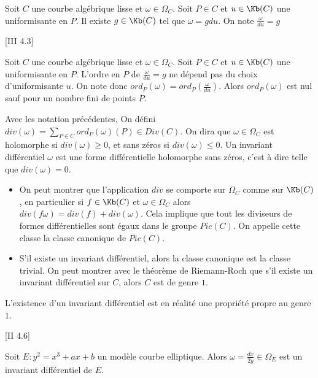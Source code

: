 \begin{Def}
	Soit $C$ une courbe algébrique lisse et $\omega\in\Omega_{C}$. Soit $P\in C$ et $u\in \Kb(C)$ une uniformisante en $P$. Il existe $g\in\Kb(C)$ tel que $\omega = gdu$. On note $\frac{\omega}{du} = g$
\end{Def}

\begin{Prop}\cite{Sil09}[III 4.3]
	
	Soit $C$ une courbe algébrique lisse et $\omega\in\Omega_{C}$. Soit $P\in C$ et $u\in \Kb(C)$ une uniformisante en $P$. L'ordre en $P$ de $\frac{\omega}{du} = g$ ne dépend pas du choix d'uniformisante $u$. On note donc $ord_{P}(\omega) = ord_{P}(\frac{\omega}{du})$. Alors $ord_{P}(\omega)$ est nul sauf pour un nombre fini de points $P$.
\end{Prop}



\begin{Def}
	Avec les notation précédentes, On défini $div(\omega) = \sum_{P\in C} ord_{P}(\omega)(P) \in Div(C)$. On dira que $\omega\in\Omega_{C}$ est holomorphe si $div(\omega)\geq 0$, et sans zéros si $div(\omega)\leq 0$. Un invariant différentiel $\omega$ est une forme différentielle holomorphe sans zéros, c'est à dire telle que $div(\omega) = 0$.
\end{Def}

\begin{Rem}
	
	\begin{itemize}
		\item On peut montrer que l'application $div$ se comporte sur $\Omega_{C}$ comme sur $\Kb(C)$, en particulier si $f\in\Kb(C)$ et $\omega\in\Omega_{C}$ alors $div(f\omega) = div(f) + div(\omega)$. Cela implique que tout les diviseurs de formes différentielles sont égaux dans le groupe $Pic(C)$. On appelle cette classe la classe canonique de $Pic(C)$. 
		
		\item S'il existe un invariant différentiel, alors la classe canonique est la classe trivial. On peut montrer avec le théorème de Riemann-Roch que s'il existe un invariant différentiel sur $C$, alors $C$ est de genre $1$.
		
	\end{itemize}
\end{Rem}

L'existence d'un invariant différentiel est en réalité une propriété propre au genre $1$.

\begin{Prop}\cite{Sil09}[II 4.6]
	
	Soit $E : y^2 = x^3 + ax + b$ un modèle courbe elliptique. Alors $\omega = \frac{dx}{2y}\in\Omega_{E}$ est un invariant différentiel de $E$.
\end{Prop}

